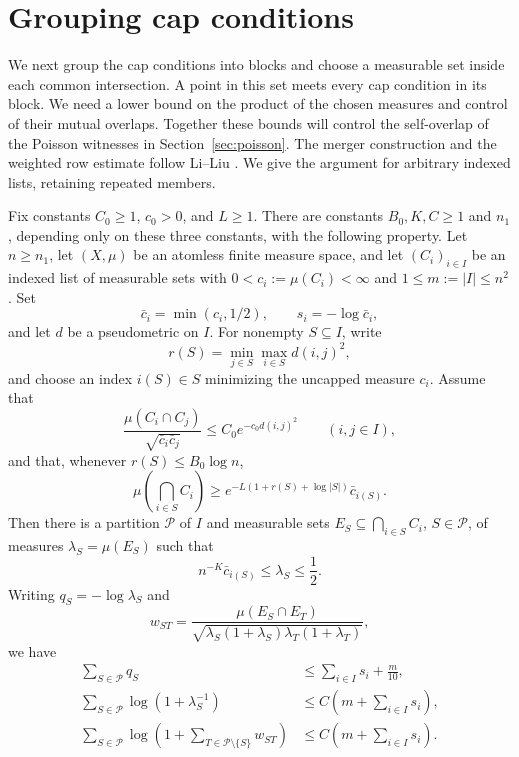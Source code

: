 \section{Grouping cap conditions}
\label{sec:blocks}

We next group the cap conditions into blocks and choose a measurable set
inside each common intersection.  A point in this set meets every cap
condition in its block.  We need a lower bound on the product of the chosen
measures and control of their mutual overlaps.  Together these bounds will
control the self-overlap of the Poisson witnesses in
Section~\ref{sec:poisson}.  The merger construction and the weighted
row estimate follow Li--Liu
\cite[Proposition~9.1 and Lemmas~9.4--9.5]{LiLiu2026Lattice}.
We give the argument for arbitrary indexed lists, retaining repeated members.

\begin{proposition}\label{prop:blocks}
Fix constants $C_0\ge1$, $c_0>0$, and $L\ge1$.
There are constants $B_0,K,C\ge1$ and $n_1$, depending only on these
three constants, with the following property.
Let $n\ge n_1$, let $(X,\mu)$ be an atomless finite measure space, and let
$(C_i)_{i\in I}$ be an indexed list of measurable sets with
$0<c_i:=\mu(C_i)<\infty$ and $1\le m:=|I|\le n^2$.
Set
\[
 \bar c_i=\min(c_i,1/2),\qquad s_i=-\log\bar c_i,
\]
and let $d$ be a pseudometric on $I$.  For nonempty $S\subseteq I$, write
\[
 r(S)=\min_{j\in S}\max_{i\in S}d(i,j)^2,
\]
and choose an index $i(S)\in S$ minimizing the uncapped measure $c_i$.
Assume that
\begin{equation}\label{eq:block-affinity-input}
 \frac{\mu(C_i\cap C_j)}{\sqrt{\bar c_i\bar c_j}}
 \le C_0e^{-c_0d(i,j)^2}\qquad(i,j\in I),
\end{equation}
and that, whenever $r(S)\le B_0\log n$,
\begin{equation}\label{eq:block-lens-input}
 \mu\left(\bigcap_{i\in S}C_i\right)
 \ge e^{-L(1+r(S)+\log|S|)}\bar c_{i(S)}.
\end{equation}
Then there is a partition $\mathcal P$ of $I$ and measurable sets
$E_S\subseteq\bigcap_{i\in S}C_i$, $S\in\mathcal P$, of measures
$\lambda_S=\mu(E_S)$ such that
\begin{equation}\label{eq:block-anchor-loss}
 n^{-K}\bar c_{i(S)}\le\lambda_S\le\frac12.
\end{equation}
Writing $q_S=-\log\lambda_S$ and
\[
 w_{ST}=
 \frac{\mu(E_S\cap E_T)}
 {\sqrt{\lambda_S(1+\lambda_S)\lambda_T(1+\lambda_T)}},
\]
we have
\begin{align}
 \sum_{S\in\mathcal P}q_S
 &\le\sum_{i\in I}s_i+\frac{m}{10},
 \label{eq:block-log-cost}\\
 \sum_{S\in\mathcal P}\log(1+\lambda_S^{-1})
 &\le C\left(m+\sum_{i\in I}s_i\right),
 \label{eq:block-first-budget}\\
 \sum_{S\in\mathcal P}
 \log\left(1+\sum_{T\in\mathcal P\setminus\{S\}}w_{ST}\right)
 &\le C\left(m+\sum_{i\in I}s_i\right).
 \label{eq:block-row-budget}
\end{align}
\end{proposition}

